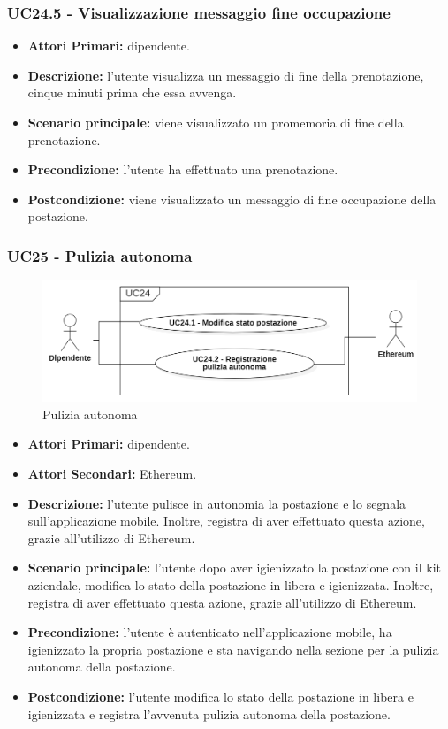 \subsubsection{ UC24.5 - Visualizzazione messaggio fine occupazione}
\begin{itemize}
	\item\textbf{Attori Primari:} dipendente.
	\item\textbf{Descrizione:} l’utente visualizza un messaggio di fine della prenotazione, cinque minuti prima che essa avvenga.
	\item\textbf{Scenario principale:} viene visualizzato un promemoria di fine della prenotazione.
	\item\textbf{Precondizione:} l’utente ha effettuato una prenotazione.
	\item\textbf{Postcondizione:} viene visualizzato un messaggio di fine occupazione della postazione.
\end{itemize}

\subsubsection{ UC25 - Pulizia autonoma}
\begin{figure}[H]
	\centering
	\includegraphics[width=15cm]{res/images/UC23.png}
	\caption{Pulizia autonoma}
	\label{fig:Pulizia autonoma}
\end{figure}
\begin{itemize}
	\item\textbf{Attori Primari:} dipendente.
	\item\textbf{Attori Secondari:} Ethereum.
	\item\textbf{Descrizione:} l’utente pulisce in autonomia la postazione e lo segnala sull'applicazione mobile. Inoltre, 
	registra di aver effettuato questa azione, grazie all'utilizzo di Ethereum.	
	\item\textbf{Scenario principale:} l’utente dopo aver igienizzato la postazione con il kit aziendale, modifica lo stato della postazione in libera e igienizzata. Inoltre, 
	registra di aver effettuato questa azione, grazie all'utilizzo di Ethereum.
	\item\textbf{Precondizione:} l’utente è autenticato nell'applicazione mobile, ha igienizzato la propria postazione e sta navigando nella sezione per la pulizia 
	autonoma della postazione.
	\item\textbf{Postcondizione:} l’utente modifica lo stato della postazione in libera e igienizzata e registra l'avvenuta pulizia autonoma della postazione.
\end{itemize}
